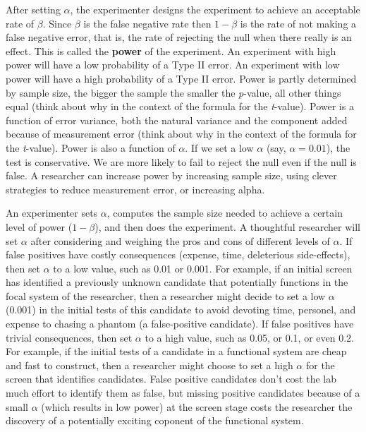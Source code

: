 \documentclass[]{book}
\begin{document}
After setting \(\alpha\), the experimenter designs the experiment to achieve an acceptable rate of \(\beta\). Since \(\beta\) is the false negative rate then \(1-\beta\) is the rate of not making a false negative error, that is, the rate of rejecting the null when there really is an effect. This is called the \textbf{power} of the experiment. An experiment with high power will have a low probability of a Type II error. An experiment with low power will have a high probability of a Type II error. Power is partly determined by sample size, the bigger the sample the smaller the \emph{p}-value, all other things equal (think about why in the context of the formula for the \emph{t}-value). Power is a function of error variance, both the natural variance and the component added because of measurement error (think about why in the context of the formula for the \emph{t}-value). Power is also a function of \(\alpha\). If we set a low \(\alpha\) (say, \(\alpha=0.01\)), the test is conservative. We are more likely to fail to reject the null even if the null is false. A researcher can increase power by increasing sample size, using clever strategies to reduce measurement error, or increasing alpha.

An experimenter sets \(\alpha\), computes the sample size needed to achieve a certain level of power (\(1-\beta\)), and then does the experiment. A thoughtful researcher will set \(\alpha\) after considering and weighing the pros and cons of different levels of \(\alpha\). If false positives have costly consequences (expense, time, deleterious side-effects), then set \(\alpha\) to a low value, such as 0.01 or 0.001. For example, if an initial screen has identified a previously unknown candidate that potentially functions in the focal system of the researcher, then a researcher might decide to set a low \(\alpha\) (0.001) in the initial tests of this candidate to avoid devoting time, personel, and expense to chasing a phantom (a false-positive candidate). If false positives have trivial consequences, then set \(\alpha\) to a high value, such as 0.05, or 0.1, or even 0.2. For example, if the initial tests of a candidate in a functional system are cheap and fast to construct, then a researcher might choose to set a high \(\alpha\) for the screen that identifies candidates. False positive candidates don't cost the lab much effort to identify them as false, but missing positive candidates because of a small \(\alpha\) (which results in low power) at the screen stage costs the researcher the discovery of a potentially exciting coponent of the functional system.
\end{document}
